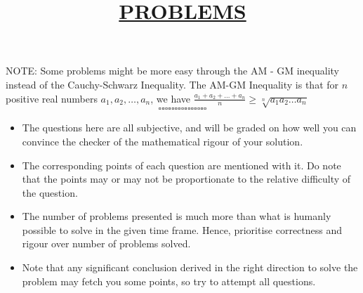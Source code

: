 \documentclass[12pt]{article}
\begin{document}
NOTE: Some problems might be more easy through the AM - GM inequality instead of the Cauchy-Schwarz Inequality. The AM-GM Inequality is that for $n$ positive real numbers $a_1,a_2,\dots,a_n$, we have $\displaystyle\frac{a_1+a_2+\ldots+a_n}{n} \geq \sqrt[n]{a_1 a_2 \ldots a_n}$
$$\square \square \square \square \square \square \square \square \square \square \square \square \square \square \square $$
\newpage
\maketitle
\title{\begin{center}\textbf{\underline{\fontsize{18}{12}\selectfont PROBLEMS}}\end{center}}
\begin{itemize}
    \item The questions here are all subjective, and will be graded on how well you can convince the checker of the mathematical rigour of your solution.
    \item The corresponding points of each question are mentioned with it. Do note that the points may or may not be proportionate to the relative difficulty of the question.
    \item The number of problems presented is much more than what is humanly possible to solve in the given time frame. Hence, prioritise correctness and rigour over number of problems solved.
    \item Note that any significant conclusion derived in the right direction to solve the problem may fetch you some points, so try to attempt all questions.
\end{itemize}
\bigskip
\bigskip
\bigskip
\end{document}
